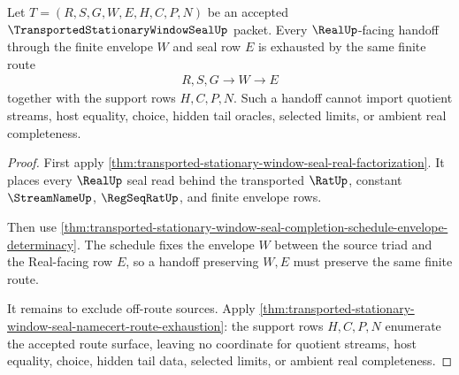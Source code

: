 \begin{theorem}
\label{thm:transported-stationary-window-seal-finite-envelope-handoff-exhaustion}
Let $T=(R,S,G,W,E,H,C,P,N)$ be an accepted $\TransportedStationaryWindowSealUp$ packet. Every $\RealUp$-facing handoff through the finite envelope $W$ and seal row $E$ is exhausted by the same finite route
$$
\begin{aligned}
  R,S,G
  \longrightarrow
  W
  \longrightarrow
  E
\end{aligned}
$$
together with the support rows $H,C,P,N$. Such a handoff cannot import quotient streams, host equality, choice, hidden tail oracles, selected limits, or ambient real completeness.
\end{theorem}
\begin{proof}
First apply \autoref{thm:transported-stationary-window-seal-real-factorization}. It places every $\RealUp$ seal read behind the transported $\RatUp$, constant $\StreamNameUp$, $\RegSeqRatUp$, and finite envelope rows.

Then use \autoref{thm:transported-stationary-window-seal-completion-schedule-envelope-determinacy}. The schedule fixes the envelope $W$ between the source triad and the Real-facing row $E$, so a handoff preserving $W,E$ must preserve the same finite route.

It remains to exclude off-route sources. Apply \autoref{thm:transported-stationary-window-seal-namecert-route-exhaustion}: the support rows $H,C,P,N$ enumerate the accepted route surface, leaving no coordinate for quotient streams, host equality, choice, hidden tail data, selected limits, or ambient real completeness.
\end{proof}

